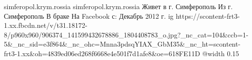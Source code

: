  
 
 
 
 

\par
simferopol.krym.rossia
simferopol.krym.rossia
Живет в г. Симферополь
Из г. Симферополь
В браке
На Facebook с: Декабрь 2012 г.
\ifcmt
  ig https://scontent-frt3-1.xx.fbcdn.net/v/t31.18172-8/p960x960/906374_141599432678886_1804408783_o.jpg?_nc_cat=104&ccb=1-5&_nc_sid=e3f864&_nc_ohc=Mnna3pdsqYIAX_GbM35&_nc_ht=scontent-frt3-1.xx&oh=4839ed06ed268f6668e4e501f7d1afe8&oe=618FE11D
  @width 0.15
\fi

